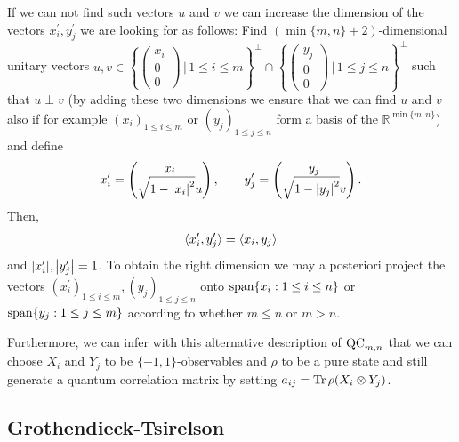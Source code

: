 	If we can not find such vectors $u$ and $v$ we can increase the dimension of the vectors $x_i^\prime,y_j^\prime$ we are looking for as follows: Find $(\min\{m,n\}+2)$-dimensional unitary vectors $u,v\in\left\{\begin{pmatrix} x_i \\ 0 \\ 0 \end{pmatrix} \,\bigg| \, 1\leq i \leq m\right\}^\perp \cap \left\{\begin{pmatrix} y_j \\ 0 \\ 0 \end{pmatrix}\,\bigg| \, 1\leq j \leq n\right\}^\perp$ such that $u\perp v$ (by adding these two dimensions we ensure that we can find $u$ and $v$ also if for example $(x_i)_{1\leq i \leq m}$ or $(y_j)_{1\leq j \leq n}$ form a basis of the $\mathbb{R}^{\min\{m,n\}}$) and define 
	\begin{align*}
		x_i^\prime = \begin{pmatrix}
			x_i \\ \sqrt{1-{\left|{x_i}\right|}^2}u
		\end{pmatrix},\qquad
		y_j^\prime = \begin{pmatrix}
			y_j \\ \sqrt{1-{\left|{y_j}\right|}^2}v
		\end{pmatrix}.
	\end{align*}
	Then,
	\begin{align*}
		\langle{x_i^\prime},{y_j^\prime}\rangle = \langle{x_i},{y_j}\rangle
	\end{align*}
	and ${\left|{x_i^\prime}\right|},{\left|{y_j^\prime}\right|}=1$.
	To obtain the right dimension we may a posteriori project the vectors $(x_i^\prime)_{1\leq i \leq m},(y_j)_{1\leq j \leq n}$ onto $\operatorname{span}\{x_i : 1\leq i \leq n\}$ or $\operatorname{span}\{y_j : 1\leq j \leq m\}$ according to whether $m\leq n$ or $m > n$.
	
	Furthermore, we can infer with this alternative description of $\textup{QC}_{m,n}$ that we can choose $X_i$ and $Y_j$ to be $\{-1,1\}$-observables and $\rho$ to be a pure state and still generate a quantum correlation matrix by setting $a_{ij} = \textup{Tr} \, {\rho(X_i\otimes Y_j)} $.

\subsection{Grothendieck-Tsirelson}

